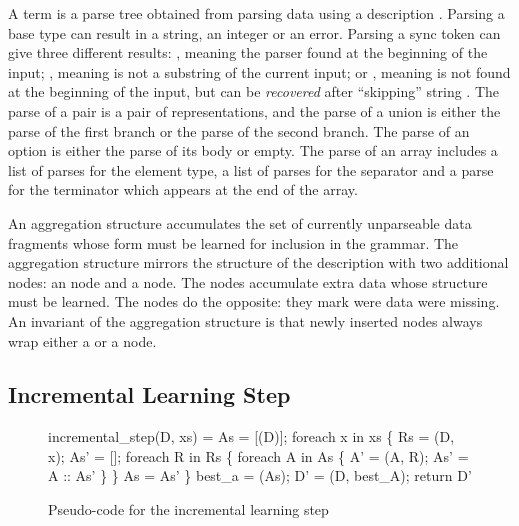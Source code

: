 A term  is a parse tree obtained from parsing 
data using a description .  Parsing a base type can result in a
string, an integer or an error.  Parsing a sync token
 can give three different results: , meaning the
parser found  at the beginning of the input; , meaning
 is not a substring of the current input; or ,
meaning  is not found at the beginning of the input, but
can be {\em recovered} after ``skipping'' string .  The parse
of a pair is a pair of representations, and the parse of a union is
either the parse of the first branch or the parse of the second
branch. The parse of an option is either the parse of its body or  empty.
The parse of an array includes a list of parses for the
element type, a list of parses for the separator and a parse for the
terminator which appears at the end of the array.

An aggregation structure accumulates the set of currently
unparseable data fragments whose form must be learned
for inclusion in the grammar.
The aggregation structure mirrors the structure of the description  
with two additional nodes: an  node and a  node. 
The  nodes accumulate extra data whose structure must be learned.
The  nodes do the opposite: they mark were data were missing.  
An invariant
of the aggregation structure is that
newly inserted  nodes always wrap either a  or 
a  node.


\subsection{Incremental Learning Step}
\begin{figure}[t]
\begin{codebox}
incremental_step(D, xs) =
  As = [(D)];
  foreach x in xs \{
    Rs = (D, x);
    As' = [];
    foreach R in Rs \{
      foreach A in As \{
        A' = (A, R); 
        As' = A :: As'
      \}
    \}
    As = As'
  \} 
  best_a = (As);
  D' = (D, best_A);  
  return D'
\end{codebox}
\caption{Pseudo-code for the incremental learning step}
\label{fig:inc-learning}
\end{figure}

